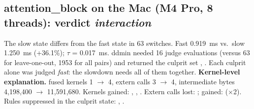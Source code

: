 \subsection*{attention\_block on the Mac (M4 Pro, 8 threads): verdict \emph{interaction}}
The slow state differs from the fast state in 63 switches. Fast 0.919~ms vs.\ slow 1.250~ms (+36.1\%); $\tau$ = 0.017~ms. ddmin needed 16 judge evaluations (versus 63 for leave-one-out, 1953 for all pairs) and returned the culprit set , . Each culprit alone was judged \emph{fast}: the slowdown needs all of them together. \textbf{Kernel-level explanation.} fused kernels 1 $\rightarrow$ 4, extern calls 3 $\rightarrow$ 4, intermediate bytes 4,198,400 $\rightarrow$ 11,591,680. Kernels gained: , , . Extern calls lost: ; gained:  ($\times$2). Rules suppressed in the culprit state: , . 
